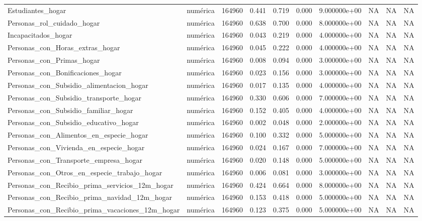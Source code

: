 \begin{longtable}[t]{llllllllll}
Estudiantes\_hogar & numérica & 164960 & 0.441 & 0.719 & 0.000 & 9.000000e+00 & NA & NA & NA\\
Personas\_rol\_cuidado\_hogar & numérica & 164960 & 0.638 & 0.700 & 0.000 & 8.000000e+00 & NA & NA & NA\\
Incapacitados\_hogar & numérica & 164960 & 0.043 & 0.219 & 0.000 & 4.000000e+00 & NA & NA & NA\\
Personas\_con\_Horas\_extras\_hogar & numérica & 164960 & 0.045 & 0.222 & 0.000 & 4.000000e+00 & NA & NA & NA\\
Personas\_con\_Primas\_hogar & numérica & 164960 & 0.008 & 0.094 & 0.000 & 3.000000e+00 & NA & NA & NA\\
Personas\_con\_Bonificaciones\_hogar & numérica & 164960 & 0.023 & 0.156 & 0.000 & 3.000000e+00 & NA & NA & NA\\
Personas\_con\_Subsidio\_alimentacion\_hogar & numérica & 164960 & 0.017 & 0.135 & 0.000 & 4.000000e+00 & NA & NA & NA\\
Personas\_con\_Subsidio\_transporte\_hogar & numérica & 164960 & 0.330 & 0.606 & 0.000 & 7.000000e+00 & NA & NA & NA\\
Personas\_con\_Subsidio\_familiar\_hogar & numérica & 164960 & 0.152 & 0.405 & 0.000 & 4.000000e+00 & NA & NA & NA\\
Personas\_con\_Subsidio\_educativo\_hogar & numérica & 164960 & 0.002 & 0.048 & 0.000 & 2.000000e+00 & NA & NA & NA\\
Personas\_con\_Alimentos\_en\_especie\_hogar & numérica & 164960 & 0.100 & 0.332 & 0.000 & 5.000000e+00 & NA & NA & NA\\
Personas\_con\_Vivienda\_en\_especie\_hogar & numérica & 164960 & 0.024 & 0.167 & 0.000 & 7.000000e+00 & NA & NA & NA\\
Personas\_con\_Transporte\_empresa\_hogar & numérica & 164960 & 0.020 & 0.148 & 0.000 & 5.000000e+00 & NA & NA & NA\\
Personas\_con\_Otros\_en\_especie\_trabajo\_hogar & numérica & 164960 & 0.006 & 0.081 & 0.000 & 3.000000e+00 & NA & NA & NA\\
Personas\_con\_Recibio\_prima\_servicios\_12m\_hogar & numérica & 164960 & 0.424 & 0.664 & 0.000 & 8.000000e+00 & NA & NA & NA\\
Personas\_con\_Recibio\_prima\_navidad\_12m\_hogar & numérica & 164960 & 0.153 & 0.418 & 0.000 & 5.000000e+00 & NA & NA & NA\\
Personas\_con\_Recibio\_prima\_vacaciones\_12m\_hogar & numérica & 164960 & 0.123 & 0.375 & 0.000 & 5.000000e+00 & NA & NA & NA\\

\end{longtable}

